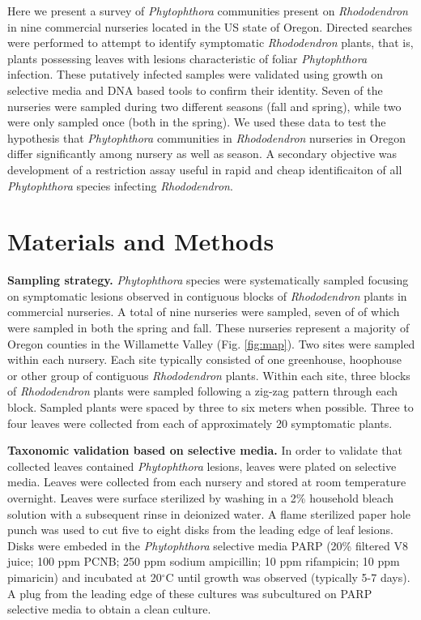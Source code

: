 \documentclass[12pt]{article}
\begin{document}
Here we present a survey of \emph{Phytophthora} communities present on \emph{Rhododendron} in nine commercial nurseries located in the US state of Oregon.  Directed searches were performed to attempt to identify symptomatic \emph{Rhododendron} plants, that is, plants possessing leaves with lesions characteristic of foliar \emph{Phytophthora} infection.  These putatively infected samples were validated using growth on selective media and DNA based tools to confirm their identity.  Seven of the nurseries were sampled during two different seasons (fall and spring), while two were only sampled once (both in the spring).  We used these data to test the hypothesis that \emph{Phytophthora} communities in \emph{Rhododendron} nurseries in Oregon differ significantly among nursery as well as season. A secondary objective was development of a restriction assay useful in rapid and cheap identificaiton of all \emph{Phytophthora} species infecting \emph{Rhododendron}.


\section*{\sffamily\normalsize{Materials and Methods}}

\textbf{Sampling strategy.} \emph{Phytophthora} species were systematically sampled focusing on symptomatic lesions observed in contiguous blocks of \emph{Rhododendron} plants in commercial nurseries.  A total of nine  nurseries were sampled, seven of of which were sampled in both  the spring and fall.  These nurseries represent a majority of Oregon counties in the Willamette Valley (Fig. \ref{fig:map}).  Two sites were sampled within each nursery.  Each site typically consisted of one greenhouse, hoophouse or other group of contiguous \emph{Rhododendron} plants.  Within each site, three blocks of \emph{Rhododendron} plants were sampled following a zig-zag pattern through each block.  Sampled plants were spaced by three to six meters when possible.  Three to four leaves were collected from each of approximately 20 symptomatic plants.

\textbf{Taxonomic validation based on selective media.} In order to validate that collected leaves contained \emph{Phytophthora} lesions, leaves were plated on selective media.  Leaves were collected from each nursery and stored at room temperature overnight.  Leaves were surface sterilized by washing in a 2\% household bleach solution with a subsequent rinse in deionized water.  A flame sterilized paper hole punch was used to cut five to eight disks from the leading edge of leaf lesions.  Disks were embeded in the \emph{Phytophthora} selective media PARP (20\% filtered V8 juice; 100 ppm PCNB; 250 ppm sodium ampicillin; 10 ppm rifampicin; 10 ppm pimaricin)\cite{jeffers_martin_1986} and incubated at 20$^\circ$C until growth was observed (typically 5-7 days).  A plug from the leading edge of these cultures was subcultured on PARP selective media to obtain a clean culture.
\end{document}
